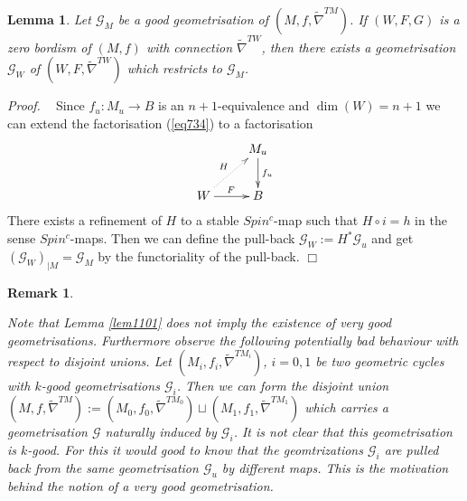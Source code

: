 \documentclass[12pt]{article}
\newtheorem{lem}[theorem]{Lemma}
\newtheorem{rem}[theorem]{Remark}
\newcommand{\cG}{{\mathcal{G}}}
\def\hB{\hspace*{\fill}$\Box$ \newline\noindent}
\newcommand{\proof}{{\it Proof.$\:\:\:\:$}}
\begin{document}
 
\begin{lem}\label{lem907}
Let $\cG_{M}$ be  a good geometrisation of $(M,f,\tilde \nabla^{TM})$. If $(W,F,G)$ is a zero bordism of $(M,f)$  with connection $\tilde \nabla^{TW}$, then there exists a geometrisation
$\cG_{W}$ of $(W,F,\tilde \nabla^{TW})$ which restricts to $\cG_{M}$.
\end{lem}
\proof
Since $f_{u}:M_{u}\to B$ is an $n+1$-equivalence and $\dim(W)=n+1$
we can   extend the factorisation (\ref{eq734})  to a factorisation
\begin{equation}\label{eq734vvvv}\xymatrix{&M_{u}\ar[d]^{f_{u}}\\W\ar[r]^{F}\ar@{..>}[ur]^H&B}\end{equation}
There exists a refinement of $H$ to a stable $Spin^{c}$-map such that $H\circ i=h$ in the sense $Spin^{c}$-maps.
Then we can define the pull-back  $\cG_{W}:=H^{*}\cG_{u}$ and get $(\cG_{W})_{|M}=\cG_{M}$
 by the   functoriality  of the pull-back. \hB 

\begin{rem}\label{chadcldc}{\rm Note that Lemma \ref{lem1101}  does not imply the existence of very good geometrisations. Furthermore observe the following potentially bad behaviour with respect to disjoint unions. Let $(M_{i},f_{i},\tilde\nabla^{TM_{i}})$, $i=0,1$ be two geometric cycles with  $k$-good geometrisations $\cG_{i}$. Then we can form the disjoint union
$(M,f,\tilde \nabla^{TM}):= (M_{0},f_{0},\tilde\nabla^{TM_{0}})\sqcup (M_{1},f_{1},\tilde\nabla^{TM_{1}})$ which carries a geometrisation $\cG$ naturally induced by $\cG_{i}$. It is not clear that
 this geometrisation is   $k$-good. For this it would good to know that the geomtrizations $\cG_{i}$ are pulled back from the {\em same} geometrisation $\cG_{u}$ by different maps. This is  the motivation behind the notion of a very good geometrisation.
 
}\end{rem}
\end{document}
